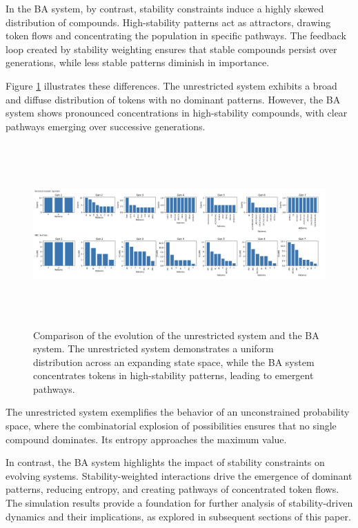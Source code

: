 \documentclass[entropy,article,submit,pdftex,oneauthor]{Definitions/mdpi}
\begin{document}
In the BA system, by contrast, stability constraints induce a highly skewed distribution of compounds. High-stability patterns act as attractors, drawing token flows and concentrating the population in specific pathways. The feedback loop created by stability weighting ensures that stable compounds persist over generations, while less stable patterns diminish in importance.

Figure \ref{fig:simulation_results} illustrates these differences. The unrestricted system exhibits a broad and diffuse distribution of tokens with no dominant patterns. However, the BA system shows pronounced concentrations in high-stability compounds, with clear pathways emerging over successive generations.

\begin{figure}[h]
    \centering
    \includegraphics[width=1\textwidth,height=7cm]{monte-carlo-fits.png}
    \caption{Comparison of the evolution of the unrestricted system and the BA system. The unrestricted system demonstrates a uniform distribution across an expanding state space, while the BA system concentrates tokens in high-stability patterns, leading to emergent pathways.}
    \label{fig:simulation_results}
\end{figure}

The unrestricted system exemplifies the behavior of an unconstrained probability space, where the combinatorial explosion of possibilities ensures that no single compound dominates. Its entropy approaches the maximum value.

In contrast, the BA system highlights the impact of stability constraints on evolving systems. Stability-weighted interactions drive the emergence of dominant patterns, reducing entropy, and creating pathways of concentrated token flows. The simulation results provide a foundation for further analysis of stability-driven dynamics and their implications, as explored in subsequent sections of this paper.
\end{document}
